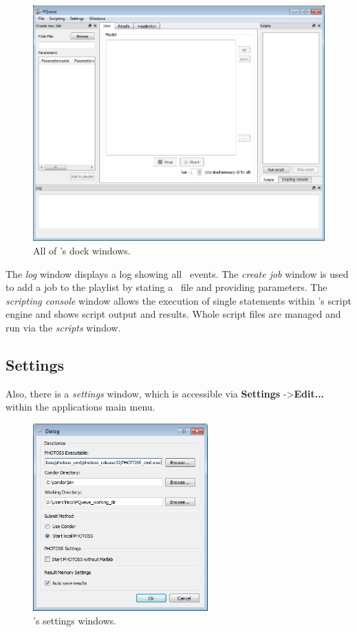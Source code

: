 	\begin{figure}[!ht]
	\includegraphics[width=\textwidth]{Screenshots/PQueue/all_dock_widgets.png}
	\caption{All of \PQUEUE's dock windows.}
	\label{pqueue:all_dock_widgets}
	\end{figure}

	The \textit{log} window displays a log showing all \PQUEUE\ events.
	The \textit{create job} window is used to add a job to the playlist by stating a \PJOB\ file
	and providing parameters.
	The \textit{scripting console} window allows the execution of single statements within \PQUEUE's
	script engine and shows script output and results.
	Whole script files are managed and run via the \textit{scripts} window.


\subsection{Settings}
\label{pqueue:settings}

	Also, there is a \textit{settings} window,
	which is accessible via \textbf{Settings} -\textgreater \textbf{Edit...} within the applications main menu.

	\begin{figure}[!ht]
	\centering
	\includegraphics[width=0.6\textwidth]{Screenshots/PQueue/settings.png}
	\caption{\PQUEUE's settings windows.}
	\label{pqueue:settings_window}
	\end{figure}
	
